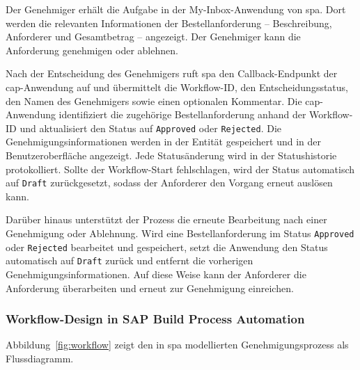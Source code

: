 Der Genehmiger erhält die Aufgabe in der My-Inbox-Anwendung von \gls{spa}. Dort werden die relevanten Informationen der Bestellanforderung -- Beschreibung, Anforderer und Gesamtbetrag -- angezeigt. Der Genehmiger kann die Anforderung genehmigen oder ablehnen.

Nach der Entscheidung des Genehmigers ruft \gls{spa} den Callback-Endpunkt der \gls{cap}-Anwendung auf und übermittelt die Workflow-ID, den Entscheidungsstatus, den Namen des Genehmigers sowie einen optionalen Kommentar. Die \gls{cap}-Anwendung identifiziert die zugehörige Bestellanforderung anhand der Workflow-ID und aktualisiert den Status auf \texttt{Approved} oder \texttt{Rejected}. Die Genehmigungsinformationen werden in der Entität gespeichert und in der Benutzeroberfläche angezeigt. Jede Statusänderung wird in der Statushistorie protokolliert. Sollte der Workflow-Start fehlschlagen, wird der Status automatisch auf \texttt{Draft} zurückgesetzt, sodass der Anforderer den Vorgang erneut auslösen kann.

Darüber hinaus unterstützt der Prozess die erneute Bearbeitung nach einer Genehmigung oder Ablehnung. Wird eine Bestellanforderung im Status \texttt{Approved} oder \texttt{Rejected} bearbeitet und gespeichert, setzt die Anwendung den Status automatisch auf \texttt{Draft} zurück und entfernt die vorherigen Genehmigungsinformationen. Auf diese Weise kann der Anforderer die Anforderung überarbeiten und erneut zur Genehmigung einreichen.

\subsubsection{Workflow-Design in SAP Build Process Automation}

Abbildung~\ref{fig:workflow} zeigt den in \gls{spa} modellierten Genehmigungsprozess als Flussdiagramm.

